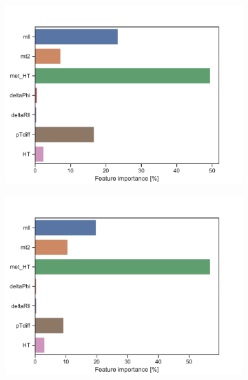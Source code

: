 \begin{figure}[H]
\begin{subfigure}[t!]{0.49\textwidth}
        \includegraphics[width = \textwidth]{Figures/WW/BDT/High_level/Inter/featureImportance.pdf}
        \caption{}
        \label{fig:featWWLow}
    \end{subfigure}
    \begin{subfigure}[t!]{0.49\textwidth}
        \includegraphics[width = \textwidth]{Figures/Mono_Z/ML/BDT/High_level/Inter/featureImportance.pdf}
        \caption{}
        \label{fig:featMonoZLow}
    \end{subfigure}
    \caption{}
    \label{fig:Non}
\end{figure}

